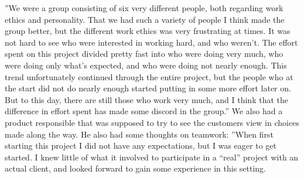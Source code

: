 \newline
''We were a group consisting of six very different people, both regarding work ethics and personality. That we had such a variety of people I think made the group better, but the different work ethics was very frustrating at times. It was not hard to see who were interested in working hard, and who weren’t. The effort spent on this project divided pretty fast into who were doing very much, who were doing only what’s expected, and who were doing not nearly enough. This trend unfortunately continued through the entire project, but the people who at the start did not do nearly enough started putting in some more effort later on. But to this day, there are still those who work very much, and I think that the difference in effort spent has made some discord in the group.''
\newline
\newline
We also had a product responsible that was supposed to try to see the customers view in choices made along the way. He also had some thoughts on teamwork:
\newline
\newline
''When first starting this project I did not have any expectations, but I was eager to get started. I knew little of what it involved to participate in a “real” project with an actual client, and looked forward to gain some experience in this setting.

